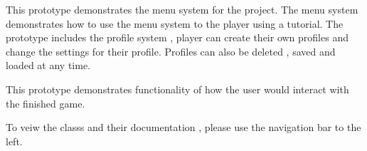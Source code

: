 This prototype demonstrates the menu system for the project. The menu system demonstrates how to use the menu system to the player using a tutorial. The prototype includes the profile system , player can create their own profiles and change the settings for their profile. Profiles can also be deleted , saved and loaded at any time.

This prototype demonstrates functionality of how the user would interact with the finished game.

To veiw the class\textquotesingle{}s and their documentation , please use the navigation bar to the left. 